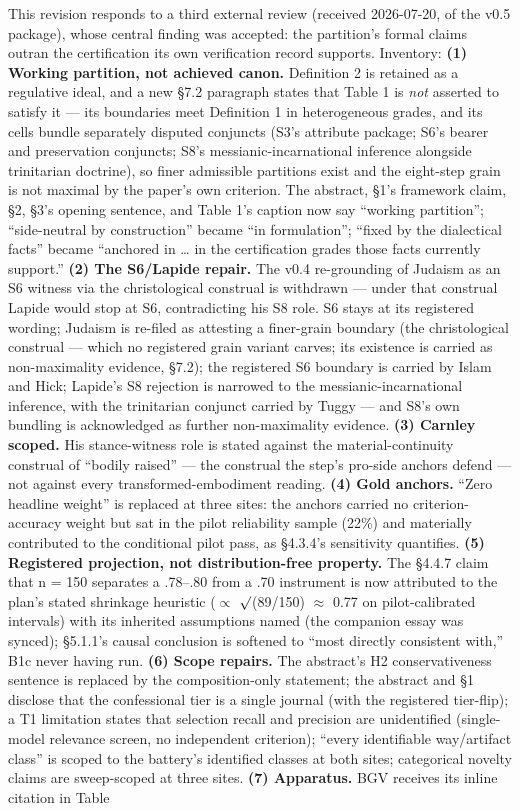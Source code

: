 This revision responds to a third external review (received 2026-07-20, of the v0.5 package), whose central finding was accepted: the partition's formal claims outran the certification its own verification record supports. Inventory: \textbf{(1) Working partition, not achieved canon.} Definition 2 is retained as a regulative ideal, and a new \S{}7.2 paragraph states that Table 1 is \emph{not} asserted to satisfy it --- its boundaries meet Definition 1 in heterogeneous grades, and its cells bundle separately disputed conjuncts (S3's attribute package; S6's bearer and preservation conjuncts; S8's messianic-incarnational inference alongside trinitarian doctrine), so finer admissible partitions exist and the eight-step grain is not maximal by the paper's own criterion. The abstract, \S{}1's framework claim, \S{}2, \S{}3's opening sentence, and Table 1's caption now say ``working partition''; ``side-neutral by construction'' became ``in formulation''; ``fixed by the dialectical facts'' became ``anchored in \ldots{} in the certification grades those facts currently support.'' \textbf{(2) The S6/Lapide repair.} The v0.4 re-grounding of Judaism as an S6 witness via the christological construal is withdrawn --- under that construal Lapide would stop at S6, contradicting his S8 role. S6 stays at its registered wording; Judaism is re-filed as attesting a finer-grain boundary (the christological construal --- which no registered grain variant carves; its existence is carried as non-maximality evidence, \S{}7.2); the registered S6 boundary is carried by Islam and Hick; Lapide's S8 rejection is narrowed to the messianic-incarnational inference, with the trinitarian conjunct carried by Tuggy --- and S8's own bundling is acknowledged as further non-maximality evidence. \textbf{(3) Carnley scoped.} His stance-witness role is stated against the material-continuity construal of ``bodily raised'' --- the construal the step's pro-side anchors defend --- not against every transformed-embodiment reading. \textbf{(4) Gold anchors.} ``Zero headline weight'' is replaced at three sites: the anchors carried no criterion-accuracy weight but sat in the pilot reliability sample (22\%) and materially contributed to the conditional pilot pass, as \S{}4.3.4's sensitivity quantifies. \textbf{(5) Registered projection, not distribution-free property.} The \S{}4.4.7 claim that n = 150 separates a .78--.80 from a .70 instrument is now attributed to the plan's stated shrinkage heuristic ($\propto$ $\surd$(89/150) $\approx$ 0.77 on pilot-calibrated intervals) with its inherited assumptions named (the companion essay was synced); \S{}5.1.1's causal conclusion is softened to ``most directly consistent with,'' B1c never having run. \textbf{(6) Scope repairs.} The abstract's H2 conservativeness sentence is replaced by the composition-only statement; the abstract and \S{}1 disclose that the confessional tier is a single journal (with the registered tier-flip); a T1 limitation states that selection recall and precision are unidentified (single-model relevance screen, no independent criterion); ``every identifiable way/artifact class'' is scoped to the battery's identified classes at both sites; categorical novelty claims are sweep-scoped at three sites. \textbf{(7) Apparatus.} BGV receives its inline citation in Table 